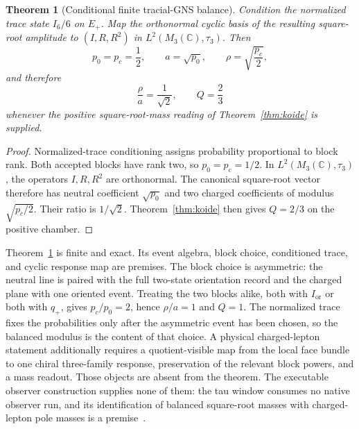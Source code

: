 \documentclass[11pt]{article}
\newtheorem{theorem}{Theorem}
\theoremstyle{remark}
\newcommand{\C}{\mathbb C}
\begin{document}
\begin{theorem}[Conditional finite tracial-GNS balance]
\label{thm:gns}
Condition the normalized trace state \(I_6/6\) on \(E_+\). Map the orthonormal
cyclic basis of the resulting square-root amplitude to
\((I,R,R^2)\) in \(L^2(M_3(\C),\tau_3)\). Then
\[
p_0=p_c=\frac12,
\qquad
a=\sqrt{p_0},
\qquad
\rho=\sqrt{\frac{p_c}{2}},
\]
and therefore
\[
\frac{\rho}{a}=\frac1{\sqrt2},
\qquad
Q=\frac23
\]
whenever the positive square-root-mass reading of
Theorem~\ref{thm:koide} is supplied.
\end{theorem}

\begin{proof}
Normalized-trace conditioning assigns probability proportional to block
rank. Both accepted blocks have rank two, so \(p_0=p_c=1/2\). In
\(L^2(M_3(\C),\tau_3)\), the operators \(I,R,R^2\) are orthonormal. The
canonical square-root vector therefore has neutral coefficient
\(\sqrt{p_0}\) and two charged coefficients of modulus
\(\sqrt{p_c/2}\). Their ratio is \(1/\sqrt2\). Theorem~\ref{thm:koide}
then gives \(Q=2/3\) on the positive chamber.
\end{proof}

Theorem~\ref{thm:gns} is finite and exact. Its event algebra, block choice,
conditioned trace, and cyclic response map are premises. The block choice is
asymmetric: the neutral line is paired with the full two-state orientation
record and the charged plane with one oriented event. Treating the two blocks
alike, both with \(I_{\mathrm{or}}\) or both with \(q_+\), gives
\(p_c/p_0=2\), hence \(\rho/a=1\) and \(Q=1\). The normalized trace fixes the
probabilities only after the asymmetric event has been chosen, so the
balanced modulus is the content of that choice. A physical
charged-lepton statement additionally requires a quotient-visible map from
the local face bundle to one chiral three-family response, preservation of
the relevant block powers, and a mass readout. Those objects are absent from
the theorem. The executable observer construction supplies none of them: the
tau window consumes no native observer run, and its identification of
balanced square-root masses with charged-lepton pole masses is a
premise~\cite{ophmodel,ophtaucomparison}.
\end{document}
